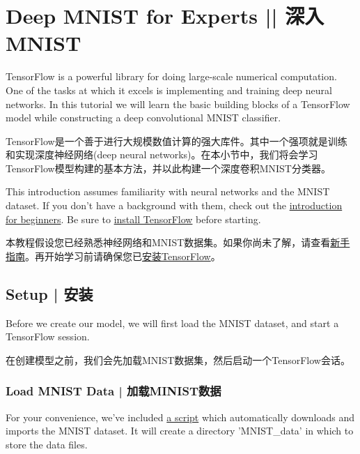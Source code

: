 



\newpage
\section {Deep MNIST for Experts   ||   深入MNIST} \label{MINIST_pros}

TensorFlow is a powerful library for doing large-scale numerical computation. One of the tasks at which it excels is implementing and training deep neural networks. In this tutorial we will learn the basic building blocks of a TensorFlow model while constructing a deep convolutional MNIST classifier.

TensorFlow是一个善于进行大规模数值计算的强大库件。其中一个强项就是训练和实现深度神经网络(deep neural networks)。在本小节中，我们将会学习TensorFlow模型构建的基本方法，并以此构建一个深度卷积MNIST分类器。

This introduction assumes familiarity with neural networks and the MNIST dataset. If you don't have a background with them, check out the \hyperref[MINIST_beginner]{introduction for beginners}. Be sure to \hyperref[download_install]{install TensorFlow} before starting.

本教程假设您已经熟悉神经网络和MNIST数据集。如果你尚未了解，请查看\hyperref[MINIST_beginner]{新手指南}。再开始学习前请确保您已\hyperref[download_install]{安装TensorFlow}。

%
\subsection {Setup   |   安装}

Before we create our model, we will first load the MNIST dataset, and start a TensorFlow session.

在创建模型之前，我们会先加载MNIST数据集，然后启动一个TensorFlow会话。

\subsubsection {Load MNIST Data  |  加载MINIST数据}

For your convenience, we've included \href{https://tensorflow.googlesource.com/tensorflow/+/master/tensorflow/examples/tutorials/mnist/input_data.py}{a script} which automatically downloads and imports the MNIST dataset. It will create a directory 'MNIST_data' in which to store the data files.


